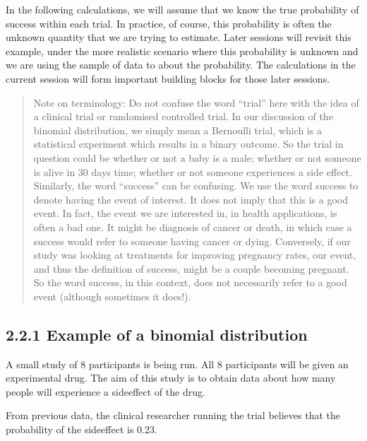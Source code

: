 \documentclass[letterpaper,10pt,english]{jupyterBook}
\begin{document}
\sphinxAtStartPar
In the following calculations, we will assume that we know the true probability of success within each trial. In practice, of course, this probability is often the unknown quantity that we are trying to estimate. Later sessions will revisit this example, under the more realistic scenario where this probability is unknown and we are using the sample of data to  about the probability. The calculations in the current session will form important building blocks for those later sessions.
\begin{quote}

\sphinxAtStartPar
Note on terminology:    \sphinxhyphen{} Do not confuse the word “trial” here with the idea of a clinical trial or randomised controlled trial. In our discussion of the binomial distribution, we simply mean a Bernoulli trial, which is a statistical experiment which results in a binary outcome. So the trial in question could be whether or not a baby is a male; whether or not someone is alive in 30 days time; whether or not someone experiences a side effect.    \sphinxhyphen{} Similarly, the word “success” can be confusing. We use the word success to denote having the event of interest. It does not imply that this is a good event. In fact, the event we are interested in, in health applications, is often a bad one. It might be diagnosis of cancer or death, in which case a success would refer to someone having cancer or dying. Conversely, if our study was looking at treatments for improving pregnancy rates, our event, and thus the definition of success, might be a couple becoming pregnant. So the word success, in this context, does not necessarily refer to a good event (although sometimes it does!).
\end{quote}


\subsection{2.2.1 Example of a binomial distribution}
\label{\detokenize{02.c. Probability.Discrete:example-of-a-binomial-distribution}}
\sphinxAtStartPar
A small study of 8 participants is being run. All 8 participants will be given an experimental drug. The aim of this study is to obtain data about how many people will experience a side\sphinxhyphen{}effect of the drug.

\sphinxAtStartPar
From previous data, the clinical researcher running the trial believes that the probability of the side\sphinxhyphen{}effect is 0.23.
\end{document}

